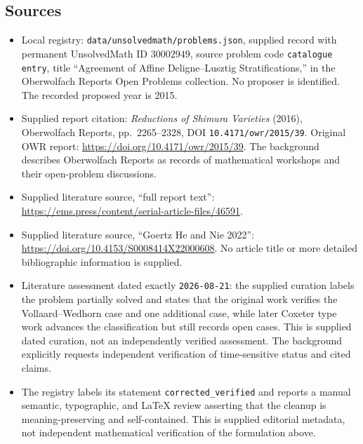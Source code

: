 \documentclass[11pt]{article}
\begin{document}
\subsection{Sources}
\begin{itemize}
\item Local registry: \texttt{data/unsolvedmath/problems.json}, supplied record with permanent UnsolvedMath ID \(30002949\), source problem code \texttt{catalogue entry}, title ``Agreement of Affine Deligne--Lusztig Stratifications,'' in the Oberwolfach Reports Open Problems collection. No proposer is identified. The recorded proposed year is 2015.
\item Supplied report citation: \emph{Reductions of Shimura Varieties} (2016), Oberwolfach Reports, pp.~2265--2328, DOI \texttt{10.4171/owr/2015/39}. Original OWR report: \url{https://doi.org/10.4171/owr/2015/39}. The background describes Oberwolfach Reports as records of mathematical workshops and their open-problem discussions.
\item Supplied literature source, ``full report text'': \url{https://ems.press/content/serial-article-files/46591}.
\item Supplied literature source, ``Goertz He and Nie 2022'': \url{https://doi.org/10.4153/S0008414X22000608}. No article title or more detailed bibliographic information is supplied.
\item Literature assessment dated exactly \texttt{2026-08-21}: the supplied curation labels the problem partially solved and states that the original work verifies the Vollaard--Wedhorn case and one additional case, while later Coxeter type work advances the classification but still records open cases. This is supplied dated curation, not an independently verified assessment. The background explicitly requests independent verification of time-sensitive status and cited claims.
\item The registry labels its statement \texttt{corrected\_verified} and reports a manual semantic, typographic, and LaTeX review asserting that the cleanup is meaning-preserving and self-contained. This is supplied editorial metadata, not independent mathematical verification of the formulation above.
\end{itemize}
\end{document}
